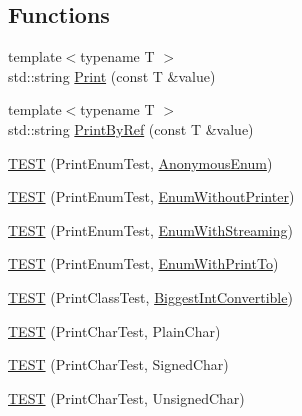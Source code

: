 \subsection*{Functions}
\begin{DoxyCompactItemize}
\item 
{\footnotesize template$<$typename T $>$ }\\std\+::string \mbox{\hyperlink{namespacetesting_1_1gtest__printers__test_ab1fefdb330a473343afa3cc6d46a65f6}{Print}} (const T \&value)
\item 
{\footnotesize template$<$typename T $>$ }\\std\+::string \mbox{\hyperlink{namespacetesting_1_1gtest__printers__test_a680e1fd7cfbae100466abe89567a0ee9}{Print\+By\+Ref}} (const T \&value)
\item 
\mbox{\hyperlink{namespacetesting_1_1gtest__printers__test_ac79ac1529e754dddbaff5ba108ba3de3}{T\+E\+ST}} (Print\+Enum\+Test, \mbox{\hyperlink{googletest-printers-test_8cc_a7a5ee9fe858568a85d80af1312aefb8b}{Anonymous\+Enum}})
\item 
\mbox{\hyperlink{namespacetesting_1_1gtest__printers__test_ae435934e9be88c7813ac6aee2ce0ce53}{T\+E\+ST}} (Print\+Enum\+Test, \mbox{\hyperlink{googletest-printers-test_8cc_a404f735da62338180a19ae16f80e09c8}{Enum\+Without\+Printer}})
\item 
\mbox{\hyperlink{namespacetesting_1_1gtest__printers__test_a152cda5e11caecc372208103022726d1}{T\+E\+ST}} (Print\+Enum\+Test, \mbox{\hyperlink{googletest-printers-test_8cc_a52d9f846ca7a081ba3acf88dd6cd46dc}{Enum\+With\+Streaming}})
\item 
\mbox{\hyperlink{namespacetesting_1_1gtest__printers__test_a171e23e5a52e6b7355c00daf8391ec12}{T\+E\+ST}} (Print\+Enum\+Test, \mbox{\hyperlink{googletest-printers-test_8cc_a904d619d593201ed509be794aed041ec}{Enum\+With\+Print\+To}})
\item 
\mbox{\hyperlink{namespacetesting_1_1gtest__printers__test_a46ee2873cfeb51db5f56be0960ce333b}{T\+E\+ST}} (Print\+Class\+Test, \mbox{\hyperlink{classBiggestIntConvertible}{Biggest\+Int\+Convertible}})
\item 
\mbox{\hyperlink{namespacetesting_1_1gtest__printers__test_aa0a012b88bd8dee46707bf308aa312d1}{T\+E\+ST}} (Print\+Char\+Test, Plain\+Char)
\item 
\mbox{\hyperlink{namespacetesting_1_1gtest__printers__test_a08fe11b61c0ff62931f0172dc05c971b}{T\+E\+ST}} (Print\+Char\+Test, Signed\+Char)
\item 
\mbox{\hyperlink{namespacetesting_1_1gtest__printers__test_a54554ba079349cf09dcb6d522cfb70de}{T\+E\+ST}} (Print\+Char\+Test, Unsigned\+Char)

\end{DoxyCompactItemize}
